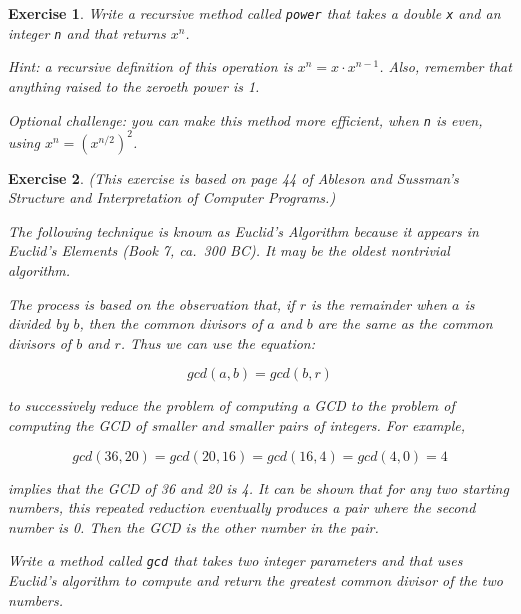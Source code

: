 \documentclass[12pt]{book}
\theoremstyle{exercise}
\newtheorem{exercise}{Exercise}[chapter]
\begin{document}
\begin{exercise}
\label{ex.power}
Write a recursive method called {\tt power} that takes a double {\tt x} and an integer {\tt n} and that returns $x^n$.

Hint: a recursive definition of this operation is $x^n = x \cdot x^{n-1}$.
Also, remember that anything raised to the zeroeth power is 1.

Optional challenge: you can make this method more efficient, when {\tt n} is even, using $x^n = \left( x^{n/2} \right)^2$.
\end{exercise}

\begin{exercise}
\label{gcd}
(This exercise is based on page 44 of Ableson and Sussman's {\em Structure and Interpretation of Computer Programs}.)

The following technique is known as Euclid's Algorithm because it appears in Euclid's {\em Elements} (Book 7, ca.~300 BC).
It may be the oldest nontrivial algorithm.

The process is based on the observation that, if $r$ is the remainder when $a$ is divided by $b$, then the common divisors of $a$ and $b$ are the same as the common divisors of $b$ and $r$.
Thus we can use the equation:

\[ gcd(a, b) = gcd(b, r) \]

to successively reduce the problem of computing a GCD to the problem of computing the GCD of smaller and smaller pairs of integers.
For example,

\[ gcd(36, 20) = gcd(20, 16) = gcd(16, 4) = gcd(4, 0) = 4 \]

implies that the GCD of 36 and 20 is 4.
It can be shown that for any two starting numbers, this repeated reduction eventually produces a pair where the second number is 0.
Then the GCD is the other number in the pair.

Write a method called {\tt gcd} that takes two integer parameters and that uses Euclid's algorithm to compute and return the greatest common divisor of the two numbers.
\end{exercise}
\end{document}
